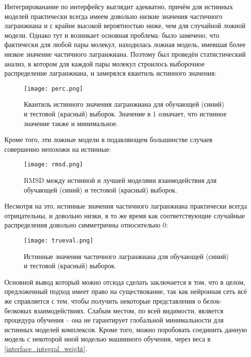 Интегрированание по интерфейсу выглядит адекватно, причём для истинных моделей практически всегда имеем довольно низкие значения частичного лагранжиана и с крайне высокой вероятностью ниже, чем для случайной ложной модели. Однако тут и возникает основная проблема: было замечено, что фактически для любой пары молекул, находилась ложная модель, имевшая более низкое значение частичного лагранжиана. Поэтому был проведён статистический анализ, в котором для каждой пары молекул строилось выборочное распределение лагранжиана, и замерялся квантиль истинного значения:
\begin{figure}[H]
	\centering
	\texttt{[image: perc.png]}
	\caption{Квантиль истинного значения лагранжиана для обучающей (синий) и тестовой (красный) выборок. Значение в 1 означает, что истинное значение также и минимальное.}
	\label{fig_perc}
\end{figure}
Кроме того, эти ложные модели в подавляющем большинстве случаев совершенно непохожи на истинные:
\begin{figure}[H]
	\centering
	\texttt{[image: rmsd.png]}
	\caption{RMSD между истинной и лучшей моделями взаимодействия для обучающей (синий) и тестовой (красный) выборок.}
	\label{fig_rmsd}
\end{figure}
Несмотря на это, истинные значения частичного лагранжиана практически всегда отрицательны, и довольно низки, в то же время как соответствующие случайные распределения довольно симметричны относительно 0:
\begin{figure}[H]
	\centering
	\texttt{[image: trueval.png]}
	\caption{Истинные значения частичного лагранжиана для обучающей (синий) и тестовой (красный) выборок.}
	\label{fig_trueval}
\end{figure}

Основной вывод который можно отсюда сделать заключается в том, что в целом, предложенный подход имеет право на существование, так как нейронная сеть всё же справляется с тем, чтобы получить некоторые представления о белок-белковых взаимодействиях. Слабым местом, по всей видимости, является процедура обучения -- она не гарантирует глобальной минимальности для истинных моделей комплексов. Кроме того, можно поробовать соединить данную модель с некоторой иной моделью машинного обучения, через веса в \ref{interface_integral_weight}.